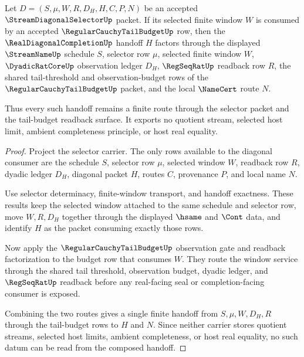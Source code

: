 \begin{theorem}
\label{thm:stream-diagonal-selector-tail-budget-readback}
Let $D=(S,\mu,W,R,D_H,H,C,P,N)$ be an accepted $\StreamDiagonalSelectorUp$ packet. If its selected finite window $W$ is consumed by an accepted $\RegularCauchyTailBudgetUp$ row, then the $\RealDiagonalCompletionUp$ handoff $H$ factors through the displayed $\StreamNameUp$ schedule $S$, selector row $\mu$, selected finite window $W$, $\DyadicRatCoreUp$ observation ledger $D_H$, $\RegSeqRatUp$ readback row $R$, the shared tail-threshold and observation-budget rows of the $\RegularCauchyTailBudgetUp$ packet, and the local $\NameCert$ route $N$.

Thus every such handoff remains a finite route through the selector packet and the tail-budget readback surface. It exports no quotient stream, selected host limit, ambient completeness principle, or host real equality.
\end{theorem}
\begin{proof}
Project the selector carrier. The only rows available to the diagonal consumer are the schedule $S$, selector row $\mu$, selected window $W$, readback row $R$, dyadic ledger $D_H$, diagonal packet $H$, routes $C$, provenance $P$, and local name $N$.

Use selector determinacy, finite-window transport, and handoff exactness. These results keep the selected window attached to the same schedule and selector row, move $W,R,D_H$ together through the displayed $\hsame$ and $\Cont$ data, and identify $H$ as the packet consuming exactly those rows.

Now apply the $\RegularCauchyTailBudgetUp$ observation gate and readback factorization to the budget row that consumes $W$. They route the window service through the shared tail threshold, observation budget, dyadic ledger, and $\RegSeqRatUp$ readback before any real-facing seal or completion-facing consumer is exposed.

Combining the two routes gives a single finite handoff from $S,\mu,W,D_H,R$ through the tail-budget rows to $H$ and $N$. Since neither carrier stores quotient streams, selected host limits, ambient completeness, or host real equality, no such datum can be read from the composed handoff.
\end{proof}


